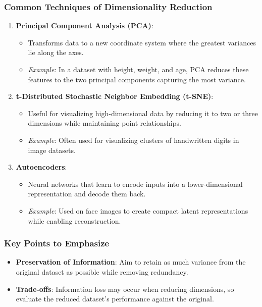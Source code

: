 \documentclass[aspectratio=169]{beamer}
\begin{document}
\begin{frame}[fragile]
    \frametitle{Common Techniques of Dimensionality Reduction}
    \begin{enumerate}
        \item \textbf{Principal Component Analysis (PCA)}: 
            \begin{itemize}
                \item Transforms data to a new coordinate system where the greatest variances lie along the axes.
                \item \textit{Example}: In a dataset with height, weight, and age, PCA reduces these features to the two principal components capturing the most variance.
            \end{itemize}
        
        \item \textbf{t-Distributed Stochastic Neighbor Embedding (t-SNE)}:
            \begin{itemize}
                \item Useful for visualizing high-dimensional data by reducing it to two or three dimensions while maintaining point relationships.
                \item \textit{Example}: Often used for visualizing clusters of handwritten digits in image datasets.
            \end{itemize}
        
        \item \textbf{Autoencoders}:
            \begin{itemize}
                \item Neural networks that learn to encode inputs into a lower-dimensional representation and decode them back.
                \item \textit{Example}: Used on face images to create compact latent representations while enabling reconstruction.
            \end{itemize}
    \end{enumerate}
\end{frame}

\begin{frame}[fragile]
    \frametitle{Key Points to Emphasize}
    \begin{itemize}
        \item \textbf{Preservation of Information}: Aim to retain as much variance from the original dataset as possible while removing redundancy.
        \item \textbf{Trade-offs}: Information loss may occur when reducing dimensions, so evaluate the reduced dataset's performance against the original.
    \end{itemize}
\end{frame}
\end{document}
